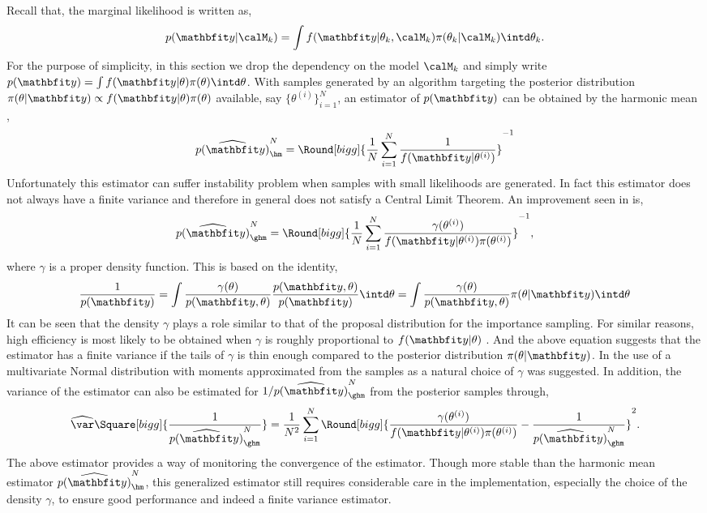 Recall that, the marginal likelihood is written as,
\begin{equation*}
  p(\data|\calM_k) = \int
  f(\data|\theta_k,\calM_k)\pi(\theta_k|\calM_k)\intd\theta_k.
\end{equation*}
For the purpose of simplicity, in this section we drop the dependency on the
model $\calM_k$ and simply write $p(\data) = \int
f(\data|\theta)\pi(\theta)\intd\theta$. With samples generated by an \mcmc
algorithm targeting the posterior distribution $\pi(\theta|\data) \propto
f(\data|\theta) \pi(\theta)$ available, say $\{\theta^{(i)}\}_{i=1}^N$, an
estimator of $p(\data)$ can be obtained by the harmonic mean
\cite{Newton:1994wm},
\begin{equation}
  \widehat{p(\data)}_{\hm}^N =
  \Round[bigg]{\frac{1}{N}\sum_{i=1}^N\frac{1}{f(\data|\theta^{(i)})}}^{-1}
\end{equation}
Unfortunately this estimator can suffer instability problem when samples with
small likelihoods are generated. In fact this estimator does not always have a
finite variance and therefore in general does not satisfy a Central Limit
Theorem. An improvement seen in \cite{Kass:1995vb} is,
\begin{equation}
  \widehat{p(\data)}_{\ghm}^N = \Round[bigg]{
    \frac{1}{N}\sum_{i=1}^N
    \frac{\gamma(\theta^{(i)})}{f(\data|\theta^{(i)})\pi(\theta^{(i)})}}^{-1},
\end{equation}
where $\gamma$ is a proper density function. This is based on the identity,
\begin{equation}
  \frac{1}{p(\data)}
  = \int \frac{\gamma(\theta)}{p(\data,\theta)}
  \frac{p(\data,\theta)}{p(\data)} \intd \theta
  = \int \frac{\gamma(\theta)}{p(\data,\theta)} \pi(\theta|\data) \intd \theta
\end{equation}
It can be seen that the density $\gamma$ plays a role similar to that of the
proposal distribution for the importance sampling. For similar reasons, high
efficiency is most likely to be obtained when $\gamma$ is roughly proportional
to $f(\data|\theta)$ \cite{Kass:1995vb}. And the above equation suggests that
the estimator has a finite variance if the tails of $\gamma$ is thin enough
compared to the posterior distribution $\pi(\theta|\data)$. In
\cite{Gelfand:1994ux} the use of a multivariate Normal distribution with
moments approximated from the samples as a natural choice of $\gamma$ was
suggested. In addition, the variance of the estimator can also be estimated
for $1/\widehat{p(\data)}_{\ghm}^N$ from the posterior samples through,
\begin{equation}
  \widehat{\var}\Square[bigg]{\frac{1}{\widehat{p(\data)}_{\ghm}^N}} =
  \frac{1}{N^2}\sum_{i=1}^N \Round[bigg]{
    \frac{\gamma(\theta^{(i)})}{f(\data|\theta^{(i)})\pi(\theta^{(i)})}
    - \frac{1}{\widehat{p(\data)}_{\ghm}^N}}^2.
\end{equation}
The above estimator provides a way of monitoring the convergence of the
estimator. Though more stable than the harmonic mean estimator
$\widehat{p(\data)}_{\hm}^N$, this generalized estimator still requires
considerable care in the implementation, especially the choice of the density
$\gamma$, to ensure good performance and indeed a finite variance estimator.

